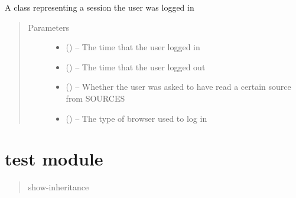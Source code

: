 \documentclass[letterpaper,10pt,english]{sphinxmanual}
\begin{document}
\begin{fulllineitems}
\label{\detokenize{session:session.Session}}
A class representing a session the user was logged in
\begin{quote}\begin{description}
\item[{Parameters}] \leavevmode\begin{itemize}
\item {} 
 () -- The time that the user logged in

\item {} 
 () -- The time that the user logged out

\item {} 
 () -- Whether the user was asked to have read a certain source from SOURCES

\item {} 
 () -- The type of browser used to log in

\end{itemize}

\end{description}\end{quote}

\end{fulllineitems}



\chapter{test module}
\label{\detokenize{test:module-test}}\label{\detokenize{test:test-module}}\label{\detokenize{test::doc}}\begin{quote}\begin{description}
\item[{show-inheritance}] \leavevmode
\end{description}\end{quote}
\end{document}
